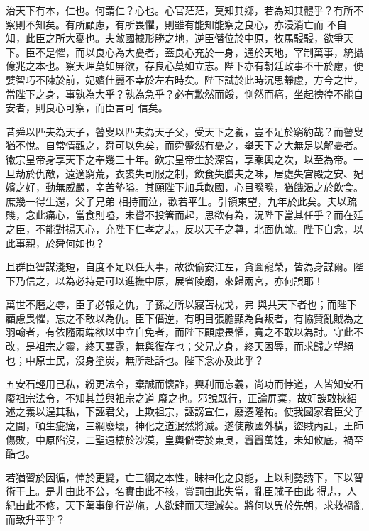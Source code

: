 \begin{pinyinscope}
 治天下有本，仁也。何謂仁？心也。心官茫茫，莫知其鄉，若為知其體乎？有所不察則不知矣。有所顧慮，有所畏懼，則雖有能知能察之良心，亦浸消亡而
 不自知，此臣之所大憂也。夫敵國據形勝之地，逆臣僭位於中原，牧馬駸駸，欲爭天下。臣不是懼，而以良心為大憂者，蓋良心充於一身，通於天地，宰制萬事，統攝億兆之本也。察天理莫如屏欲，存良心莫如立志。陛下亦有朝廷政事不干於慮，便嬖智巧不陳於前，妃嬪佳麗不幸於左右時矣。陛下試於此時沉思靜慮，方今之世，當陛下之身，事孰為大乎？孰為急乎？必有歉然而餒，惻然而痛，坐起徬徨不能自安者，則良心可察，而臣言可
 信矣。



 昔舜以匹夫為天子，瞽叟以匹夫為天子父，受天下之養，豈不足於窮約哉？而瞽叟猶不悅。自常情觀之，舜可以免矣，而舜蹙然有憂之，舉天下之大無足以解憂者。徽宗皇帝身享天下之奉幾三十年。欽宗皇帝生於深宮，享乘輿之次，以至為帝。一旦劫於仇敵，遠適窮荒，衣裘失司服之制，飲食失膳夫之味，居處失宮殿之安、妃嬪之好，動無威嚴，辛苦墊隘。其願陛下加兵敵國，心目睽睽，猶饑渴之於飲食。庶幾一得生還，父子兄弟
 相持而泣，歡若平生。引領東望，九年於此矣。夫以疏賤，念此痛心，當食則嗌，未嘗不投箸而起，思欲有為，況陛下當其任乎？而在廷之臣，不能對揚天心，充陛下仁孝之志，反以天子之尊，北面仇敵。陛下自念，以此事親，於舜何如也？



 且群臣智謀淺短，自度不足以任大事，故欲偷安江左，貪圖寵榮，皆為身謀爾。陛下乃信之，以為必持是可以進撫中原，展省陵廟，來歸兩宮，亦何誤耶！



 萬世不磨之辱，臣子必報之仇，子孫之所以寢苫枕戈，弗
 與共天下者也；而陛下顧慮畏懼，忘之不敢以為仇。臣下僭逆，有明目張膽顯為負叛者，有協贊亂賊為之羽翰者，有依隨兩端欲以中立自免者，而陛下顧慮畏懼，寬之不敢以為討。守此不改，是祖宗之靈，終天暴露，無與復存也；父兄之身，終天困辱，而求歸之望絕也；中原士民，沒身塗炭，無所赴訴也。陛下念亦及此乎？



 五安石輕用己私，紛更法令，棄誠而懷詐，興利而忘義，尚功而悖道，人皆知安石廢祖宗法令，不知其並與祖宗之道
 廢之也。邪說既行，正論屏棄，故奸諛敢挾紹述之義以逞其私，下誣君父，上欺祖宗，誣謗宣仁，廢遷隆祐。使我國家君臣父子之間，頓生疵癘，三綱廢壞，神化之道泯然將滅。遂使敵國外橫，盜賊內訌，王師傷敗，中原陷沒，二聖遠棲於沙漠，皇輿僻寄於東吳，囂囂萬姓，未知攸底，禍至酷也。



 若猶習於因循，憚於更變，亡三綱之本性，昧神化之良能，上以利勢誘下，下以智術干上。是非由此不公，名實由此不核，賞罰由此失當，亂臣賊子由此
 得志，人紀由此不修，天下萬事倒行逆施，人欲肆而天理滅矣。將何以異於先朝，求救禍亂而致升平乎？




\end{pinyinscope}
